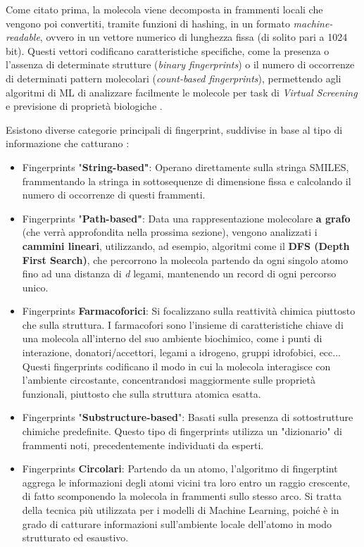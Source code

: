 Come citato prima, la molecola viene decomposta in frammenti locali che vengono poi convertiti, tramite funzioni di hashing, in un formato \textit{machine-readable}, ovvero in un vettore numerico di lunghezza fissa (di solito pari a 1024 bit).
Questi vettori codificano caratteristiche specifiche, come la presenza o l'assenza di determinate strutture (\textit{binary fingerprints}) o il numero di occorrenze di determinati pattern molecolari (\textit{count-based fingerprints}), permettendo agli algoritmi di ML di analizzare facilmente le molecole per task di \textit{Virtual Screening} e previsione di proprietà biologiche \cite{boldiniEffectivenessMolecularFingerprints2024}.

Esistono diverse categorie principali di fingerprint, suddivise in base al tipo di informazione che catturano \cite{boldiniEffectivenessMolecularFingerprints2024}:
\begin{itemize}
    \item Fingerprints "\textbf{String-based"}: Operano direttamente sulla stringa SMILES, frammentando la stringa in sottosequenze di dimensione fissa e calcolando il numero di occorrenze di questi frammenti.
    \item Fingerprints "\textbf{Path-based"}: Data una rappresentazione molecolare \textbf{a grafo} (che verrà approfondita nella prossima sezione), vengono analizzati i \textbf{cammini lineari}, utilizzando, ad esempio, algoritmi come il \textbf{DFS (Depth First Search)}, che percorrono la molecola partendo da ogni singolo atomo fino ad una distanza di \textit{d} legami, mantenendo un record di ogni percorso unico.
    \item Fingerprints \textbf{Farmacoforici}: Si focalizzano sulla reattività chimica piuttosto che sulla struttura. I farmacofori sono l'insieme di caratteristiche chiave di una molecola all'interno del suo ambiente biochimico, come i punti di interazione, donatori/accettori, legami a idrogeno, gruppi idrofobici, ecc...
    Questi fingerprints codificano il modo in cui la molecola interagisce con l'ambiente circostante, concentrandosi maggiormente sulle proprietà funzionali, piuttosto che sulla struttura atomica esatta.
    \item Fingerprints "\textbf{Substructure-based}": Basati sulla presenza di sottostrutture chimiche predefinite. Questo tipo di fingerprints utilizza un "dizionario" di frammenti noti, precedentemente individuati da esperti.
    \item Fingerprints \textbf{Circolari}: Partendo da un atomo, l'algoritmo di fingerptint aggrega le informazioni degli atomi vicini tra loro entro un raggio crescente, di fatto scomponendo la molecola in frammenti sullo stesso arco.
    Si tratta della tecnica più utilizzata per i modelli di Machine Learning, poiché è in grado di catturare informazioni sull'ambiente locale dell'atomo in modo strutturato ed esaustivo.
\end{itemize}
